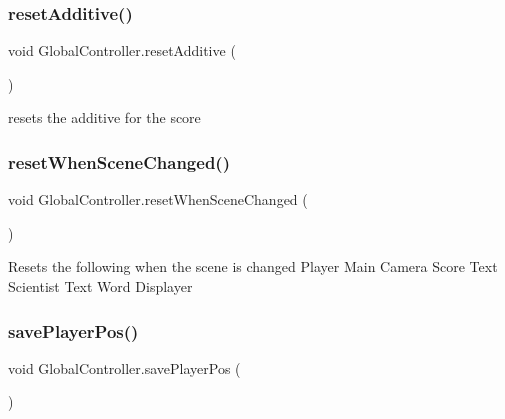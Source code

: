 \mbox{\label{class_global_controller_a5a65bdfd453a4b0f3a609d02872a2f73}} 
\subsubsection{\texorpdfstring{reset\+Additive()}{resetAdditive()}}
{\footnotesize\ttfamily void Global\+Controller.\+reset\+Additive (\begin{DoxyParamCaption}{ }\end{DoxyParamCaption})}



resets the additive for the score 

\mbox{\label{class_global_controller_a8327a637a3ce3e3766e46e449f9218ff}} 
\subsubsection{\texorpdfstring{reset\+When\+Scene\+Changed()}{resetWhenSceneChanged()}}
{\footnotesize\ttfamily void Global\+Controller.\+reset\+When\+Scene\+Changed (\begin{DoxyParamCaption}{ }\end{DoxyParamCaption})}

Resets the following when the scene is changed Player Main Camera Score Text Scientist Text Word Displayer \mbox{\label{class_global_controller_a5a71c2551eef6be2304110c96a31cb55}} 
\subsubsection{\texorpdfstring{save\+Player\+Pos()}{savePlayerPos()}}
{\footnotesize\ttfamily void Global\+Controller.\+save\+Player\+Pos (\begin{DoxyParamCaption}{ }\end{DoxyParamCaption})}



